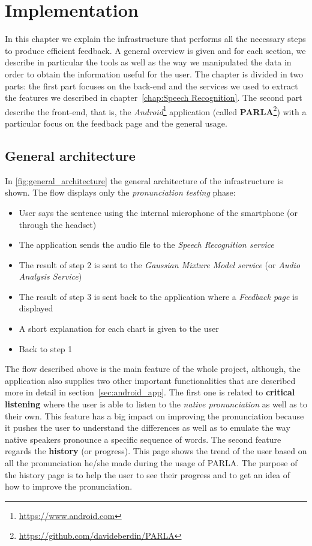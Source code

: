 \chapter{Implementation}
\label{chap:Implementation}
In this chapter we explain the infrastructure that performs all the necessary steps to produce efficient feedback. A general overview is given and for each section, we describe in particular the tools as well as the way we manipulated the data in order to obtain the information useful for the user. The chapter is divided in two parts: the first part focuses on the back-end and the services we used to extract the features we described in chapter~\ref{chap:Speech Recognition}. The second part describe the front-end, that is, the \textit{Android}\footnote{\url{https://www.android.com}} application (called \textbf{PARLA}\footnote{\url{https://github.com/davideberdin/PARLA}}) with a particular focus on the feedback page and the general usage.

\section{General architecture}
\label{sec:general_architecture}

In \ref{fig:general_architecture} the general architecture of the infrastructure is shown.
The flow displays only the \textit{pronunciation testing} phase:

\begin{itemize}
	\item[1)] User says the sentence using the internal microphone of the smartphone (or through the headset)
	\item[2)] The application sends the audio file to the \textit{Speech Recognition service}
	\item[3)] The result of step 2 is sent to the \textit{Gaussian Mixture Model service} (or \textit{Audio Analysis Service})
	\item[4)] The result of step 3 is sent back to the application where a \textit{Feedback page} is displayed
	\item[5)] A short explanation for each chart is given to the user
	\item[6)] Back to step 1
\end{itemize}

\noindent The flow described above is the main feature of the whole project, although, the application also supplies two other important functionalities that are described more in detail in section~\ref{sec:android_app}. The first one is related to \textbf{critical listening} where the user is able to listen to the \textit{native pronunciation} as well as to their own. This feature has a big impact on improving the pronunciation because it pushes the user to understand the differences as well as to emulate the way native speakers pronounce a specific sequence of words. The second feature regards the \textbf{history} (or progress). This page shows the trend of the user based on all the pronunciation he/she made during the usage of PARLA. The purpose of the history page is to help the user to see their progress and to get an idea of how to improve the pronunciation. \\

